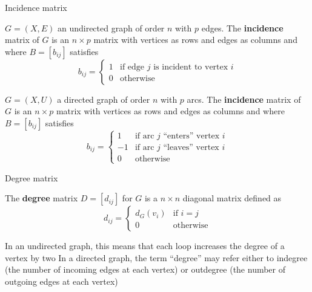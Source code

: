 \documentclass[aspectratio=43]{beamer}
\begin{document}
\begin{frame}{Incidence matrix}
	\begin{definition}
		$G=(X,E)$ an undirected graph of order $n$ with $p$ edges. The \textbf{incidence} matrix of $G$ is an $n\times p$ matrix with vertices as rows and edges as columns and where $B=[b_{ij}]$ satisfies
		\[
			b_{ij} = \begin{cases}
				1 & \text{if edge }j\text{ is incident to vertex }i \\
				0 & \text{otherwise}
			\end{cases}
		\]
	\end{definition}
	\vfill
	\begin{definition}
		$G=(X,U)$ a directed graph of order $n$ with $p$ arcs. The \textbf{incidence} matrix of $G$ is an $n\times p$ matrix with vertices as rows and edges as columns and where $B=[b_{ij}]$ satisfies
		\[
			b_{ij} = \begin{cases}
				1 & \text{if arc }j\text{ ``enters'' vertex }i \\
				-1 & \text{if arc }j\text{ ``leaves'' vertex }i \\
				0 & \text{otherwise}
			\end{cases}
		\]
	\end{definition}
\end{frame}



\begin{frame}{Degree matrix}
	\begin{definition}
		The \textbf{degree} matrix $D=[d_{ij}]$ for $G$ is a $n \times n$ diagonal matrix defined as
		\[
			d_{ij} = \begin{cases}
				d_G(v_i) & \text{if } i = j \\
				0 & \text{otherwise}
			\end{cases}
		\]
	\end{definition}
\vfill
In an undirected graph, this means that each loop increases the degree of a vertex by two
\vfill
In a directed graph, the term ``degree'' may refer either to indegree (the number of incoming edges at each vertex) or outdegree (the number of outgoing edges at each vertex)
\end{frame}
\end{document}
